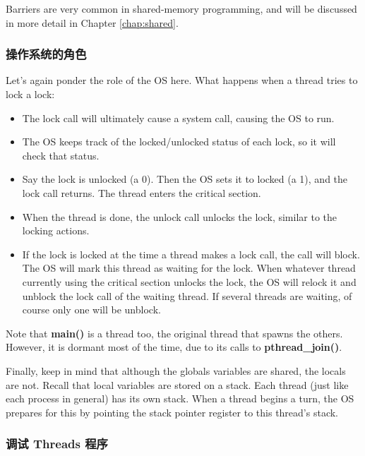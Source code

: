 Barriers are very common in shared-memory programming, and will be
discussed in more detail in Chapter \ref{chap:shared}.

\subsubsection{操作系统的角色}

Let's again ponder the role of the OS here.  What happens when a thread
tries to lock a lock:

\begin{itemize}

\item The lock call will ultimately cause a system call, causing the OS
to run.

\item The OS keeps track of the locked/unlocked status of each lock, so
it will check that status.

\item Say the lock is unlocked (a 0).  Then  the OS sets it to locked (a
1), and the lock call returns.  The thread enters the critical section.

\item When the thread is done, the unlock call unlocks the lock, similar
to the locking actions.

\item If the lock is locked at the time a thread makes a lock call, the
call will block.  The OS will mark this thread as waiting for the lock.
When whatever thread currently using the critical section unlocks the
lock, the OS will relock it and unblock the lock call of the waiting
thread.  If several threads are waiting, of course only one will be
unblock.

\end{itemize}

Note that {\bf main()} is a thread too, the original thread that spawns
the others.  However, it is dormant most of the time, due to its calls
to {\bf pthread\_join()}.

Finally, keep in mind that although the globals variables are shared,
the locals are not.  Recall that local variables are stored on a stack.
Each thread (just like each process in general) has its own stack.  When
a thread begins a turn, the OS prepares for this by pointing the stack
pointer register to this thread's stack.

\subsubsection{调试 Threads 程序}
\label{debugthreads}

